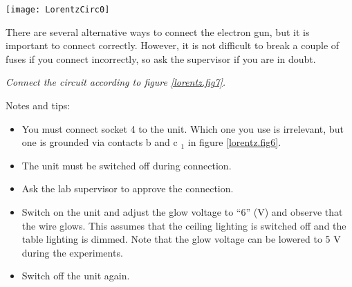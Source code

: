 \documentclass[../Elmag-labhefte-2020.tex]{subfiles}
\begin{document}
\begin{marginfigure}[-2cm]%
  \centering
    \texttt{[image: LorentzCirc0]}
    \caption{%
      Wiring diagram for the apparauts' side panel.\\
      a: Anode\\
      b: Cathode\\
      c: Cathode heating\\
      d: Wehnelt cylinder\\
      e: Deflection plates\\
      f: Anode, for symmetrical adjustment of the deflection voltage\\
      g: Helmholtz coils
    }
    \label{lorentz.fig6}
\end{marginfigure}

There are several alternative ways to connect the electron gun, but it is important to connect correctly. However, it is not difficult to break a couple of fuses if you connect incorrectly, so ask the supervisor if you are in doubt.

\emph{ Connect the circuit according to figure \ref{lorentz.fig7}.}

Notes and tips:
\begin{itemize}
    \item You must connect socket 4 to the unit. Which one you use is irrelevant, but one is grounded via contacts b and c $_1$ in figure \ref{lorentz.fig6}.
    \item The unit must be switched off during connection.
    \item Ask the lab supervisor to approve the connection.
    \item Switch on the unit and adjust the glow voltage to ``6'' (V) and observe that the wire glows. This assumes that the ceiling lighting is switched off and the table lighting is dimmed. Note that the glow voltage can be lowered to 5 V during the experiments.
    \item Switch off the unit again.
\end{itemize}
\end{document}
